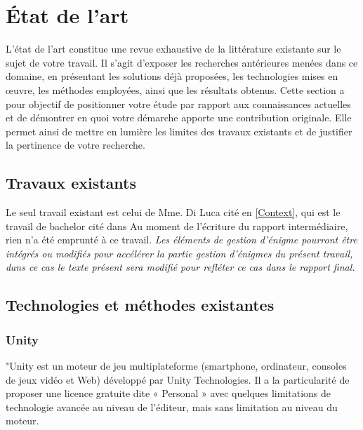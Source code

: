 \chapter{État de l'art}

L'état de l'art constitue une revue exhaustive de la littérature existante sur le sujet de votre travail. Il s'agit d'exposer les recherches antérieures menées dans ce domaine, en présentant les solutions déjà proposées, les technologies mises en œuvre, les méthodes employées, ainsi que les résultats obtenus. Cette section a pour objectif de positionner votre étude par rapport aux connaissances actuelles et de démontrer en quoi votre démarche apporte une contribution originale. Elle permet ainsi de mettre en lumière les limites des travaux existants et de justifier la pertinence de votre recherche.

\section{Travaux existants}

Le seul travail existant est celui de Mme. Di Luca cité en \ref{Context}, qui est le travail de bachelor cité dans  Au moment de l'écriture du rapport
intermédiaire, rien n'a été emprunté à ce travail. \textit{Les éléments de gestion d'énigme pourront être intégrés ou modifiés pour accélérer la partie gestion
    d'énigmes du présent travail, dans ce cas le texte présent sera modifié pour refléter ce cas dans le rapport final.}


\section{Technologies et méthodes existantes}
\subsection{Unity}
"Unity est un moteur de jeu multiplateforme (smartphone, ordinateur, consoles de jeux vidéo et Web) développé par Unity Technologies.
Il a la particularité de proposer une licence gratuite dite « Personal » avec quelques limitations de technologie avancée au niveau de l'éditeur,
mais sans limitation au niveau du moteur.


